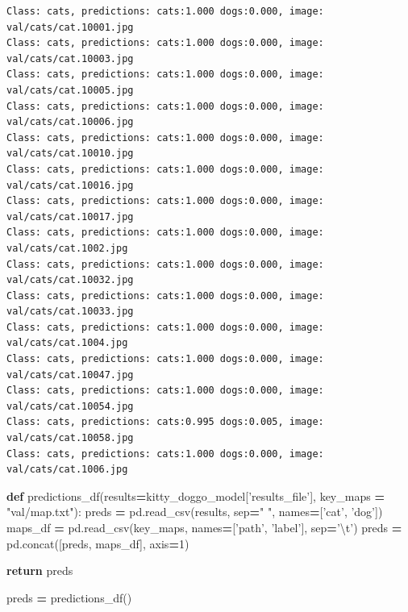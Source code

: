 \documentclass[]{book}
\newenvironment{Shaded}{\begin{snugshade}}{\end{snugshade}}
\newcommand{\KeywordTok}[1]{\textcolor[rgb]{0.13,0.29,0.53}{\textbf{#1}}}
\newcommand{\DecValTok}[1]{\textcolor[rgb]{0.00,0.00,0.81}{#1}}
\newcommand{\CharTok}[1]{\textcolor[rgb]{0.31,0.60,0.02}{#1}}
\newcommand{\StringTok}[1]{\textcolor[rgb]{0.31,0.60,0.02}{#1}}
\newcommand{\ControlFlowTok}[1]{\textcolor[rgb]{0.13,0.29,0.53}{\textbf{#1}}}
\newcommand{\OperatorTok}[1]{\textcolor[rgb]{0.81,0.36,0.00}{\textbf{#1}}}
\newcommand{\NormalTok}[1]{#1}
\theoremstyle{definition}
\theoremstyle{definition}
\theoremstyle{definition}
\theoremstyle{remark}
\begin{document}
\begin{verbatim}
Class: cats, predictions: cats:1.000 dogs:0.000, image: val/cats/cat.10001.jpg
Class: cats, predictions: cats:1.000 dogs:0.000, image: val/cats/cat.10003.jpg
Class: cats, predictions: cats:1.000 dogs:0.000, image: val/cats/cat.10005.jpg
Class: cats, predictions: cats:1.000 dogs:0.000, image: val/cats/cat.10006.jpg
Class: cats, predictions: cats:1.000 dogs:0.000, image: val/cats/cat.10010.jpg
Class: cats, predictions: cats:1.000 dogs:0.000, image: val/cats/cat.10016.jpg
Class: cats, predictions: cats:1.000 dogs:0.000, image: val/cats/cat.10017.jpg
Class: cats, predictions: cats:1.000 dogs:0.000, image: val/cats/cat.1002.jpg
Class: cats, predictions: cats:1.000 dogs:0.000, image: val/cats/cat.10032.jpg
Class: cats, predictions: cats:1.000 dogs:0.000, image: val/cats/cat.10033.jpg
Class: cats, predictions: cats:1.000 dogs:0.000, image: val/cats/cat.1004.jpg
Class: cats, predictions: cats:1.000 dogs:0.000, image: val/cats/cat.10047.jpg
Class: cats, predictions: cats:1.000 dogs:0.000, image: val/cats/cat.10054.jpg
Class: cats, predictions: cats:0.995 dogs:0.005, image: val/cats/cat.10058.jpg
Class: cats, predictions: cats:1.000 dogs:0.000, image: val/cats/cat.1006.jpg
\end{verbatim}

\begin{Shaded}
\begin{Highlighting}[]
\KeywordTok{def}\NormalTok{ predictions_df(results}\OperatorTok{=}\NormalTok{kitty_doggo_model[}\StringTok{'results_file'}\NormalTok{], }
\NormalTok{                   key_maps }\OperatorTok{=} \StringTok{"val/map.txt"}\NormalTok{):}
\NormalTok{    preds }\OperatorTok{=}\NormalTok{ pd.read_csv(results, sep}\OperatorTok{=}\StringTok{" "}\NormalTok{, names}\OperatorTok{=}\NormalTok{[}\StringTok{'cat'}\NormalTok{, }\StringTok{'dog'}\NormalTok{])}
\NormalTok{    maps_df }\OperatorTok{=}\NormalTok{ pd.read_csv(key_maps, names}\OperatorTok{=}\NormalTok{[}\StringTok{'path'}\NormalTok{, }\StringTok{'label'}\NormalTok{], sep}\OperatorTok{=}\StringTok{'}\CharTok{\textbackslash{}t}\StringTok{'}\NormalTok{)}
\NormalTok{    preds }\OperatorTok{=}\NormalTok{ pd.concat([preds, maps_df], axis}\OperatorTok{=}\DecValTok{1}\NormalTok{)}
    
    \ControlFlowTok{return}\NormalTok{ preds}
\end{Highlighting}
\end{Shaded}

\begin{Shaded}
\begin{Highlighting}[]
\NormalTok{preds }\OperatorTok{=}\NormalTok{ predictions_df()}
\end{Highlighting}
\end{Shaded}
\end{document}
